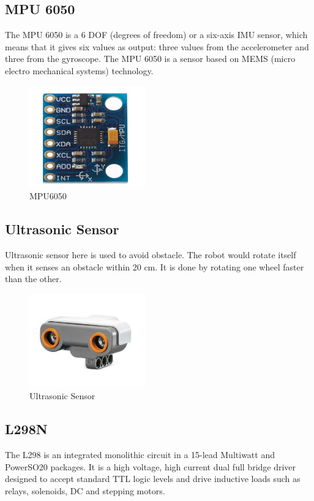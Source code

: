 \documentclass{article}
\begin{document}
 	 	
 	\subsection {MPU 6050}
 	The MPU 6050 is a 6 DOF (degrees of freedom) or a six-axis IMU sensor, which means that it gives six values as output: three values from the accelerometer and three from the gyroscope. The MPU 6050 is a sensor based on MEMS (micro electro mechanical systems) technology.
 	
 	\begin{figure}[h]
 		\centering
 		\includegraphics[width=50mm,scale=0.5]{mpu6050}
 		\caption{MPU6050}
 		\label{Fig.3: MPU6050}
 	\end{figure}
 	
 	 	
 	\pagebreak
 	 
 	\subsection{Ultrasonic Sensor}
 	Ultrasonic sensor here is used to avoid obstacle. The robot would rotate itself when it senses an obstacle within 20 cm. It is done by rotating one wheel faster than the other. 
 	
 	\begin{figure}[h]
 		\centering
 		\includegraphics[width=50mm,scale=0.5]{ultrasonic}
 		\caption{Ultrasonic Sensor}
 		\label{Fig.4: Ultrasonic Sensor}
 	\end{figure}
 
 	\subsection{L298N}
 	The L298 is an integrated monolithic circuit in a 15-lead Multiwatt and PowerSO20 packages. It is a high voltage, high current dual full bridge driver designed to accept standard TTL logic levels and drive inductive loads such as relays, solenoids, DC and stepping motors. 
 	
\end{document}
